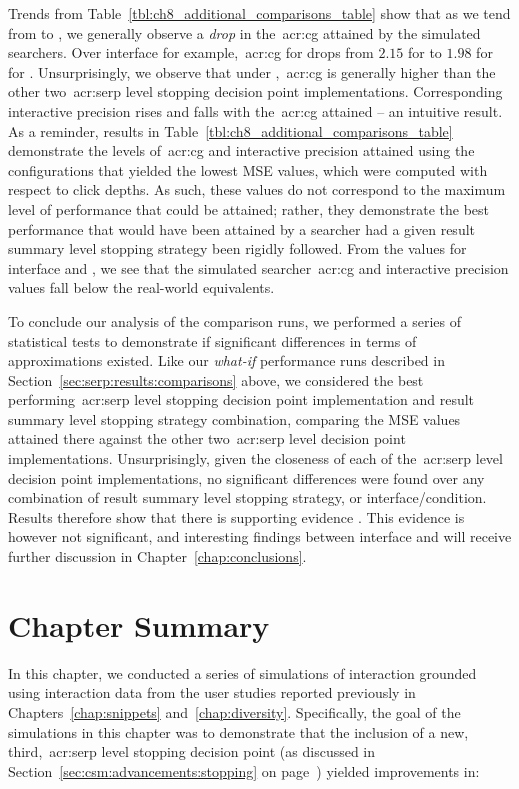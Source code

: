 Trends from Table~\ref{tbl:ch8_additional_comparisons_table} show that as we tend from  to , we generally observe a \emph{drop} in the~\gls{acr:cg} attained by the simulated searchers. Over interface  for example,~\gls{acr:cg} for  drops from $2.15$ for  to $1.98$ for  for . Unsurprisingly, we observe that under ,~\gls{acr:cg} is generally higher than the other two~\gls{acr:serp} level stopping decision point implementations. Corresponding interactive precision rises and falls with the~\gls{acr:cg} attained -- an intuitive result. As a reminder, results in Table~\ref{tbl:ch8_additional_comparisons_table} demonstrate the levels of~\gls{acr:cg} and interactive precision attained using the configurations that yielded the lowest MSE values, which were computed with respect to click depths. As such, these values do not correspond to the maximum level of performance that could be attained; rather, they demonstrate the best performance that would have been attained by a searcher had a given result summary level stopping strategy been rigidly followed. From the  values for interface  and , we see that the simulated searcher~\gls{acr:cg} and interactive precision values fall below the real-world equivalents.

To conclude our analysis of the comparison runs, we performed a series of statistical tests to demonstrate if significant differences in terms of approximations existed. Like our \emph{what-if} performance runs described in Section~\ref{sec:serp:results:comparisons} above, we considered the best performing~\gls{acr:serp} level stopping decision point implementation and result summary level stopping strategy combination, comparing the MSE values attained there against the other two~\gls{acr:serp} level decision point implementations. Unsurprisingly, given the closeness of each of the~\gls{acr:serp} level decision point implementations, no significant differences were found over any combination of result summary level stopping strategy, or interface/condition. Results therefore show that there is supporting evidence . This evidence is however not significant, and interesting findings between interface  and  will receive further discussion in Chapter~\ref{chap:conclusions}.

\section{Chapter Summary}
In this chapter, we conducted a series of simulations of interaction grounded using interaction data from the user studies reported previously in Chapters~\ref{chap:snippets} and~\ref{chap:diversity}. Specifically, the goal of the simulations in this chapter was to demonstrate that the inclusion of a new, third,~\gls{acr:serp} level stopping decision point (as discussed in Section~\ref{sec:csm:advancements:stopping} on page~\pageref{sec:csm:advancements:stopping}) yielded improvements in:


